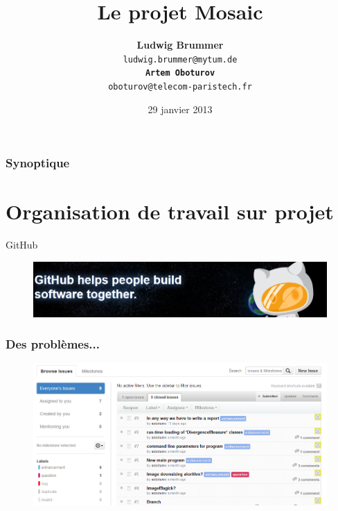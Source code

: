\documentclass[handout]{beamer}
\begin{document}
\title[Le projet Mosaic]
{\bf Le projet Mosaic \\
}
\author[ L. Brummer]{{\bf Ludwig Brummer}\\
\texttt{ludwig.brummer@mytum.de \\
\bf Artem Oboturov}\\
\texttt{oboturov@telecom-paristech.fr} \\
 }
\date{29 janvier 2013}

\begin{frame}
\titlepage
\end{frame}

\begin{frame}
\frametitle{\bf Synoptique} \tableofcontents
\end{frame}

















\section{Organisation de travail sur projet}

\begin{frame}
\begin{center}
{\Huge GitHub}
\end{center}
\begin{figure}[H]
\includegraphics[scale=0.50]{GitHub.png}
\end{figure}
\end{frame}

\begin{frame}
\frametitle{\bf Des probl\`emes...}
\begin{figure}[H]
\includegraphics[scale=0.45]{GitHubIssues.png}
\end{figure}
\end{frame}
\end{document}
